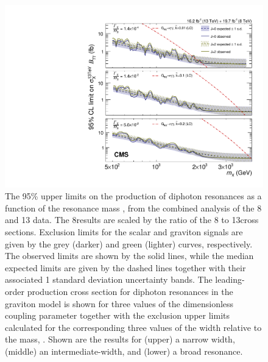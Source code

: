 \begin{figure}[htb]
    \centering
    \includegraphics[width=\cmsFigMedWidth]{Figure_006.pdf}
    \caption{
      The 95\% \CL upper limits on the production of diphoton resonances as a
      function of the resonance mass \mX, from the combined analysis of the 8 and 13\TeV
      data.
      The 8\TeV results are scaled by the ratio of the 8 to 13\TeV cross sections.
      Exclusion limits for the scalar and \RS graviton signals are given by the grey (darker) and
      green (lighter) curves, respectively.  The observed limits are shown by the solid lines,
      while the median expected limits are given by the dashed lines together with their
      associated 1 standard deviation uncertainty bands.  The leading-order production cross
      section for diphoton resonances in the \RS graviton model is shown for three values of the
      dimensionless coupling parameter \ktild together with the exclusion upper limits
      calculated for the corresponding three values of the width relative to the mass, \GammaOm.
      Shown are the results for (upper) a narrow width, (middle) an intermediate-width, and
      (lower) a broad resonance.
      \label{fig:limits:13TeV_8TeV}
    }
\end{figure}

